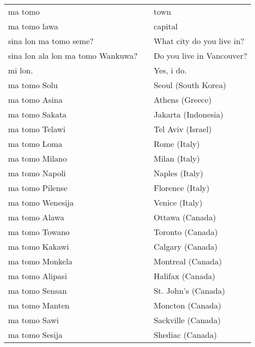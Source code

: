 \begin{supertabular}{p{4,5cm}|ll}
    ma tomo                           &  & town                      \\
    ma tomo lawa                      &  & capital                   \\
    sina lon ma tomo seme?            &  & What city do you live in? \\
    sina lon ala lon ma tomo Wankuwa? &  & Do you live in Vancouver? \\
    mi lon.                           &  & Yes, i do.                \\
    ma tomo Solu                      &  & Seoul (South Korea)       \\
    ma tomo Asina                     &  & Athens (Greece)           \\
    ma tomo Sakata                    &  & Jakarta (Indonesia)       \\
    ma tomo Telawi                    &  & Tel Aviv (Israel)         \\
    ma tomo Loma                      &  & Rome (Italy)              \\
    ma tomo Milano                    &  & Milan (Italy)             \\
    ma tomo Napoli                    &  & Naples (Italy)            \\
    ma tomo Pilense                   &  & Florence (Italy)          \\
    ma tomo Wenesija                  &  & Venice (Italy)            \\
    ma tomo Alawa                     &  & Ottawa (Canada)           \\
    ma tomo Towano                    &  & Toronto (Canada)          \\
    ma tomo Kakawi                    &  & Calgary (Canada)          \\
    ma tomo Monkela                   &  & Montreal (Canada)         \\
    ma tomo Alipasi                   &  & Halifax (Canada)          \\
    ma tomo Sensan                    &  & St. John's (Canada)       \\
    ma tomo Manten                    &  & Moncton (Canada)          \\
    ma tomo Sawi                      &  & Sackville (Canada)        \\
    ma tomo Sesija                    &  & Shediac (Canada)          \\

\end{supertabular}
